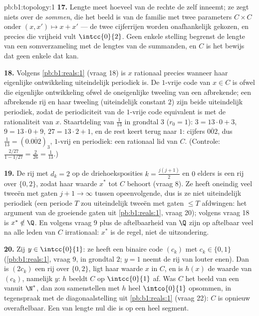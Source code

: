\begin{solution}{pb:b1:topology:1}
\textbf{17.} Lengte meet hoeveel van de rechte de  zelf
inneemt; ze zegt niets over de  \emph{sommen}, die het beeld
is van de familie met twee parameters $C \times C$ onder $(x, x') \mapsto
x + x'$ --- de twee cijferrijen worden onafhankelijk gekozen, en precies
die vrijheid vult $\intcc{0}{2}$. Geen enkele stelling begrenst de lengte
van een somverzameling met de lengtes van de summanden, en $C$ is het
bewijs dat geen enkele dat kan.

\textbf{18.} Volgens \cref{pb:b1:reals:1} (vraag 18) is $x$ rationaal
precies wanneer haar eigenlijke ontwikkeling uiteindelijk periodiek is.
De $1$-vrije code van $x \in C$ is ofwel die eigenlijke ontwikkeling
ofwel de oneigenlijke tweeling van een afbrekende; een afbrekende rij en
haar tweeling (uiteindelijk constant $2$) zijn beide uiteindelijk
periodiek, zodat de periodiciteit van de $1$-vrije code equivalent is met
de rationaliteit van $x$. Staartdeling van $\frac1{13}$ in grondtal $3$
($r_0 = 1$): $3 = 13\cdot0 + 3$, $9 = 13\cdot0 + 9$, $27 = 13\cdot2 + 1$,
en de rest keert terug naar $1$: cijfers $\overline{002}$, dus
$\frac1{13} = (0.\overline{002})_3$, $1$-vrij en periodiek: een rationaal
lid van $C$. (Controle: $\frac{2/27}{1 - 1/27} = \frac{2}{26} =
\frac1{13}$.)

\textbf{19.} De rij met $d_k = 2$ op de driehoeksposities $k =
\frac{j(j+1)}{2}$ en $0$ elders is een rij over $\{0,2\}$, zodat haar
waarde $x^*$ tot $C$ behoort (vraag 8). Ze heeft oneindig veel tweeën met
gaten $j + 1 \to \infty$ tussen opeenvolgende, dus is ze niet
uiteindelijk periodiek (een periode $T$ zou uiteindelijk tweeën met gaten
$\leq T$ afdwingen: het argument van de groeiende gaten uit
\cref{pb:b1:reals:1}, vraag 20); volgens vraag 18 is $x^* \notin \Q$. En
volgens vraag 9 plus de aftelbaarheid van $\Q$ zijn op aftelbaar veel na
alle leden van $C$ irrationaal: $x^*$ is de regel, niet de uitzondering.

\textbf{20.} Zij $y \in \intcc{0}{1}$: ze heeft een binaire code $(c_k)$
met $c_k \in \{0, 1\}$ (\cref{pb:b1:reals:1}, vraag 9, in grondtal $2$;
$y = 1$ neemt de rij van louter enen). Dan is $(2c_k)$ een rij over
$\{0,2\}$, ligt haar waarde $x$ in $C$, en is $h(x)$ de waarde van
$(c_k)$, namelijk $y$: $h$ beeldt $C$ op $\intcc{0}{1}$ af. Was $C$ het
beeld van een  vanuit $\N^*$, dan zou samenstellen met $h$ heel
$\intco{0}{1}$ opsommen, in tegenspraak met de diagonaalstelling uit
\cref{pb:b1:reals:1} (vraag 22): $C$ is opnieuw overaftelbaar. Een
 van lengte nul die  is op een heel segment.


\end{solution}
